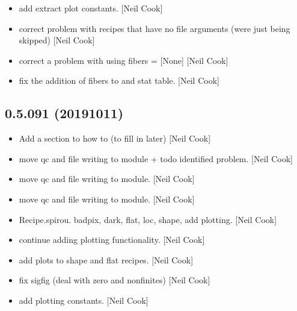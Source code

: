 \documentclass[a4paper,10pt,english]{report}
\begin{document}
\begin{itemize}
\item {} 
 \sphinxhyphen{} add extract plot constants.
{[}Neil Cook{]}

\item {} 
 \sphinxhyphen{} correct problem with recipes that have no
file arguments (were just being skipped) {[}Neil Cook{]}

\item {} 
 \sphinxhyphen{} correct a problem with using fibers = {[}None{]}
{[}Neil Cook{]}

\item {} 
 \sphinxhyphen{} fix the addition of fibers to  and stat
table. {[}Neil Cook{]}

\end{itemize}


\subsection{0.5.091 (2019\sphinxhyphen{}10\sphinxhyphen{}11)}
\label{\detokenize{misc/changelog:id71}}\begin{itemize}
\item {} 
Add a section to how to (to fill in later) {[}Neil Cook{]}

\item {} 
 \sphinxhyphen{} move qc and file writing to module + todo
identified problem. {[}Neil Cook{]}

\item {} 
 \sphinxhyphen{} move qc and file writing to module.
{[}Neil Cook{]}

\item {} 
 \sphinxhyphen{} move qc and file writing to module.
{[}Neil Cook{]}

\item {} 
Recipe.spirou. badpix, dark, flat, loc, shape,  \sphinxhyphen{} add
plotting. {[}Neil Cook{]}

\item {} 
 \sphinxhyphen{} continue adding plotting functionality. {[}Neil Cook{]}

\item {} 
 \sphinxhyphen{} add plots to shape and
flat recipes. {[}Neil Cook{]}

\item {} 
 \sphinxhyphen{} fix sigfig (deal with zero and non\sphinxhyphen{}finites)
{[}Neil Cook{]}

\item {} 
 \sphinxhyphen{} add plotting constants.
{[}Neil Cook{]}

\end{itemize}
\end{document}
